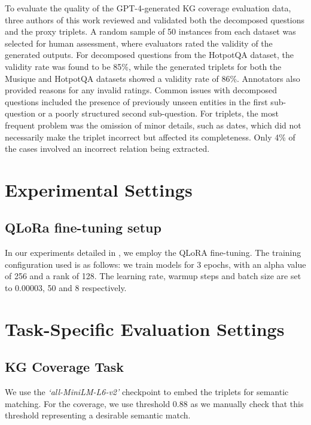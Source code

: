 \documentclass{article} %
\begin{document}
To evaluate the quality of the GPT-4-generated KG coverage evaluation data, three authors of this work reviewed and validated both the decomposed questions and the proxy triplets. A random sample of 50 instances from each dataset was selected for human assessment, where evaluators rated the validity of the generated outputs. For decomposed questions from the HotpotQA dataset, the validity rate was found to be 85\%, while the generated triplets for both the Musique and HotpotQA datasets showed a validity rate of 86\%.
Annotators also provided reasons for any invalid ratings. Common issues with decomposed questions included the presence of previously unseen entities in the first sub-question or a poorly structured second sub-question. For triplets, the most frequent problem was the omission of minor details, such as dates, which did not necessarily make the triplet incorrect but affected its completeness. Only 4\% of the cases involved an incorrect relation being extracted.


\section{Experimental Settings} 
\label{appendix:experimental-setting}

\subsection{QLoRa fine-tuning setup} \label{appendix:qlora-setup}
In our experiments detailed in , we employ the QLoRA fine-tuning. The training configuration used is as follows: we train models for 3 epochs, with an alpha value of 256 and a rank of 128. The learning rate, warmup steps and batch size are set to 0.00003, 50 and 8 respectively.

\section{Task-Specific Evaluation Settings} \label{sec:task-specific-eval-settings}
\subsection{KG Coverage Task} We use the \textit{`all-MiniLM-L6-v2'} checkpoint to embed the triplets for semantic matching. For the coverage, we use threshold 0.88 as we manually check that this threshold representing a desirable semantic match.
\end{document}
